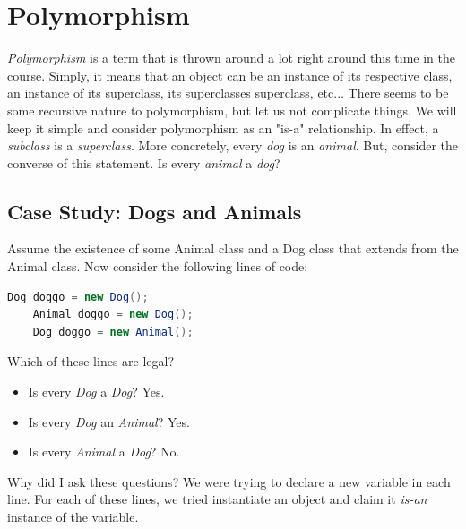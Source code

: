 \documentclass{article}
\begin{document}
\section{Polymorphism}
\textit{Polymorphism} is a term that is thrown around a lot right around this time in the course. Simply, it means that an object can be an instance of its respective class, an instance of its superclass, its superclasses superclass, etc... There seems to be some recursive nature to polymorphism, but let us not complicate things. We will keep it simple and consider polymorphism as an "is-a" relationship. In effect, a \textit{subclass} is a \textit{superclass}. More concretely, every \textit{dog} is an \textit{animal}. But, consider the converse of this statement. Is every \textit{animal} a \textit{dog}?
\subsection{Case Study: Dogs and Animals}
Assume the existence of some Animal class and a Dog class that extends from the Animal class. Now consider the following lines of code:
\begin{lstlisting}[language=Java]
    Dog doggo = new Dog();
    Animal doggo = new Dog();
    Dog doggo = new Animal();
\end{lstlisting}
Which of these lines are legal?
\begin{itemize}
    \item Is every \textit{Dog} a \textit{Dog}? Yes.
    \item Is every \textit{Dog} an \textit{Animal}? Yes.
    \item Is every \textit{Animal} a \textit{Dog}? No.
\end{itemize}
Why did I ask these questions? We were trying to declare a new variable in each line. For each of these lines, we tried instantiate an object and claim it \textit{is-an} instance of the variable.
\end{document}
